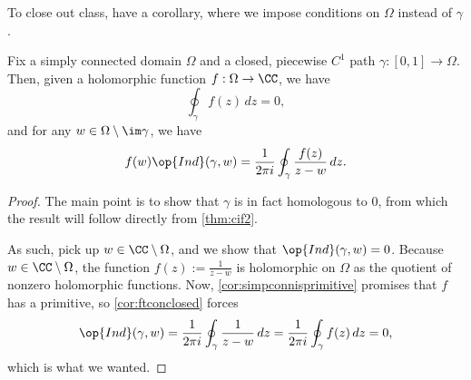 To close out class, have a corollary, where we impose conditions on $\Omega$ instead of $\gamma$.
\begin{corollary}
	Fix a simply connected domain $\Omega$ and a closed, piecewise $C^1$ path $\gamma:[0,1]\to\Omega$. Then, given a holomorphic function $f:\Omega\to\CC$, we have
	\[\oint_\gamma f(z)\,dz=0,\]
	and for any $w\in\Omega\setminus\im\gamma$, we have
	\[f(w)\op{Ind}(\gamma,w)=\frac1{2\pi i}\oint_\gamma\frac{f(z)}{z-w}\,dz.\]
\end{corollary}
\begin{proof}
	The main point is to show that $\gamma$ is in fact homologous to $0$, from which the result will follow directly from \autoref{thm:cif2}.

	As such, pick up $w\in\CC\setminus\Omega$, and we show that $\op{Ind}(\gamma,w)=0$. Because $w\in\CC\setminus\Omega$, the function $f(z):=\frac1{z-w}$ is holomorphic on $\Omega$ as the quotient of nonzero holomorphic functions. Now, \autoref{cor:simpconnisprimitive} promises that $f$ has a primitive, so \autoref{cor:ftconclosed} forces
	\[\op{Ind}(\gamma,w)=\frac1{2\pi i}\oint_\gamma\frac1{z-w}\,dz=\frac1{2\pi i}\oint_\gamma f(z)\,dz=0,\]
	which is what we wanted.
\end{proof}